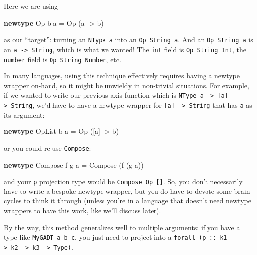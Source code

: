 \documentclass[]{article}
\newenvironment{Shaded}{}{}
\newcommand{\DataTypeTok}[1]{\textcolor[rgb]{0.56,0.13,0.00}{#1}}
\newcommand{\KeywordTok}[1]{\textcolor[rgb]{0.00,0.44,0.13}{\textbf{#1}}}
\newcommand{\NormalTok}[1]{#1}
\newcommand{\OtherTok}[1]{\textcolor[rgb]{0.00,0.44,0.13}{#1}}
\begin{document}
Here we are using

\begin{Shaded}
\begin{Highlighting}[]
\KeywordTok{newtype} \DataTypeTok{Op}\NormalTok{ b a }\OtherTok{=} \DataTypeTok{Op}\NormalTok{ (a }\OtherTok{{-}\textgreater{}}\NormalTok{ b)}
\end{Highlighting}
\end{Shaded}

as our ``target'': turning an \texttt{NType\ a} into an \texttt{Op\ String\ a}.
And an \texttt{Op\ String\ a} is an \texttt{a\ -\textgreater{}\ String}, which
is what we wanted! The \texttt{int} field is \texttt{Op\ String\ Int}, the
\texttt{number} field is \texttt{Op\ String\ Number}, etc.

In many languages, using this technique effectively requires having a newtype
wrapper on-hand, so it might be unwieldy in non-trivial situations. For example,
if we wanted to write our previous axis function which is
\texttt{NType\ a\ -\textgreater{}\ {[}a{]}\ -\textgreater{}\ String}, we'd have
to have a newtype wrapper for \texttt{{[}a{]}\ -\textgreater{}\ String} that has
\texttt{a} as its argument:

\begin{Shaded}
\begin{Highlighting}[]
\KeywordTok{newtype} \DataTypeTok{OpList}\NormalTok{ b a }\OtherTok{=} \DataTypeTok{Op}\NormalTok{ ([a] }\OtherTok{{-}\textgreater{}}\NormalTok{ b)}
\end{Highlighting}
\end{Shaded}

or you could re-use \texttt{Compose}:

\begin{Shaded}
\begin{Highlighting}[]
\KeywordTok{newtype} \DataTypeTok{Compose}\NormalTok{ f g a }\OtherTok{=} \DataTypeTok{Compose}\NormalTok{ (f (g a))}
\end{Highlighting}
\end{Shaded}

and your \texttt{p} projection type would be \texttt{Compose\ Op\ {[}{]}}. So,
you don't necessarily have to write a bespoke newtype wrapper, but you do have
to devote some brain cycles to think it through (unless you're in a language
that doesn't need newtype wrappers to have this work, like we'll discuss later).

By the way, this method generalizes well to multiple arguments: if you have a
type like \texttt{MyGADT\ a\ b\ c}, you just need to project into a
\texttt{forall\ (p\ ::\ k1\ -\textgreater{}\ k2\ -\textgreater{}\ k3\ -\textgreater{}\ Type)}.
\end{document}

